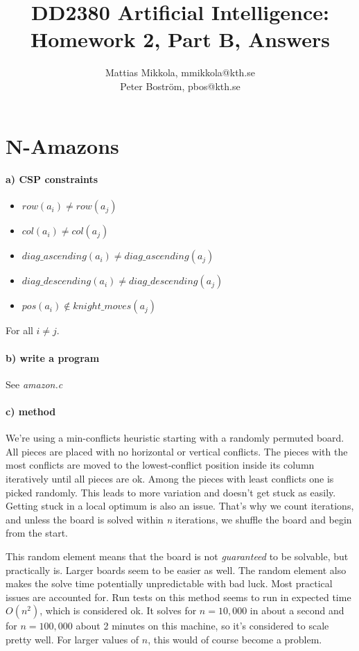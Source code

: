 \documentclass[a4paper] {article}
\title {DD2380 Artificial Intelligence:\\
	Homework 2, Part B, Answers}
\author {Mattias Mikkola, mmikkola@kth.se\\
	Peter Boström, pbos@kth.se}
\begin{document}
\maketitle

\section*{N-Amazons}
	\paragraph{a) CSP constraints}
		\begin{itemize}
			\item $row(a_i) \neq row(a_j)$
			\item $col(a_i) \neq col(a_j)$
			\item $diag\_ascending(a_i) \neq diag\_ascending(a_j)$
			\item $diag\_descending(a_i) \neq diag\_descending(a_j)$
			\item $pos(a_i) \not \in knight\_moves(a_j)$
		\end{itemize}
		For all $i \neq j$.
	\paragraph{b) write a program}
		See \emph{amazon.c}
	\paragraph{c) method}
		We're using a min-conflicts heuristic starting with a randomly permuted board. All pieces are placed with no horizontal or vertical conflicts. The pieces with the most conflicts are moved to the lowest-conflict position inside its column iteratively until all pieces are ok. Among the pieces with least conflicts one is picked randomly. This leads to more variation and doesn't get stuck as easily. Getting stuck in a local optimum is also an issue. That's why we count iterations, and unless the board is solved within \emph{n} iterations, we shuffle the board and begin from the start.

		This random element means that the board is not \emph{guaranteed} to be solvable, but practically is. Larger boards seem to be easier as well. The random element also makes the solve time potentially unpredictable with bad luck. Most practical issues are accounted for. Run tests on this method seems to run in expected time $O(n^2)$, which is considered ok. It solves for $n=10,000$ in about a second and for $n=100,000$ about 2 minutes on this machine, so it's considered to scale pretty well. For larger values of $n$, this would of course become a problem.
\end{document}

